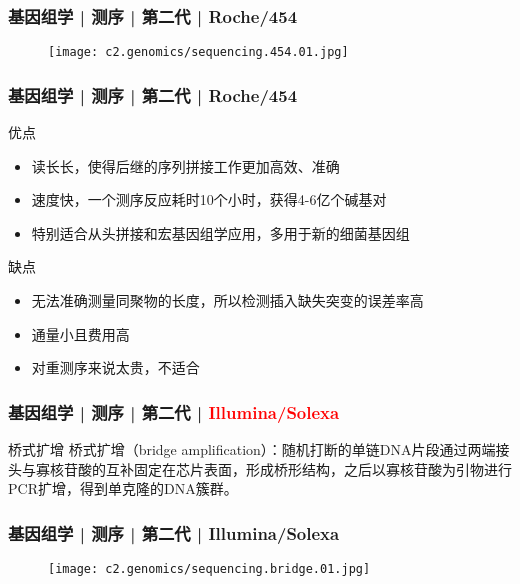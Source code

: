 
\begin{frame}
  \frametitle{基因组学 | 测序 | 第二代 | Roche/454}
  \begin{figure}
    \centering
    \texttt{[image: c2.genomics/sequencing.454.01.jpg]}
  \end{figure}
\end{frame}

\begin{frame}
  \frametitle{基因组学 | 测序 | 第二代 | Roche/454}
  \begin{block}{优点}
    \begin{itemize}
      \item 读长长，使得后继的序列拼接工作更加高效、准确
      \item 速度快，一个测序反应耗时10个小时，获得4-6亿个碱基对
      \item 特别适合从头拼接和宏基因组学应用，多用于新的细菌基因组
    \end{itemize}
  \end{block}
  \pause
  \begin{block}{缺点}
    \begin{itemize}
      \item 无法准确测量同聚物的长度，所以检测插入缺失突变的误差率高
      \item 通量小且费用高
      \item 对重测序来说太贵，不适合
    \end{itemize}
  \end{block}
\end{frame}

\begin{frame}
  \frametitle{基因组学 | 测序 | 第二代 | \textcolor{red}{Illumina/Solexa}}
  \begin{block}{桥式扩增}
桥式扩增（bridge amplification）：随机打断的单链DNA片段通过两端接头与寡核苷酸的互补固定在芯片表面，形成桥形结构，之后以寡核苷酸为引物进行PCR扩增，得到单克隆的DNA簇群。
  \end{block}
\end{frame}

\begin{frame}
  \frametitle{基因组学 | 测序 | 第二代 | Illumina/Solexa}
  \begin{figure}
    \centering
    \texttt{[image: c2.genomics/sequencing.bridge.01.jpg]}
  \end{figure}
\end{frame}

